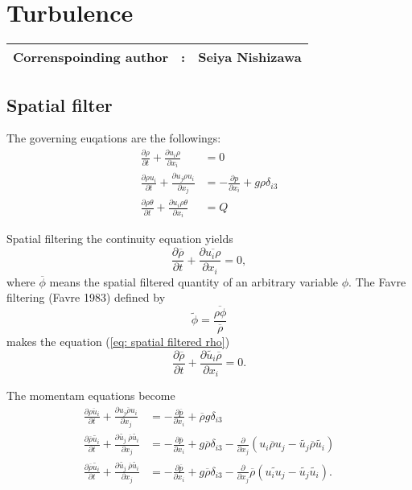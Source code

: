 %

\section{Turbulence}
{\bf \Large 
\begin{tabular}{ccc}
\hline
  Correnspoinding author & : & Seiya Nishizawa\\
\hline
\end{tabular}
}
\subsection{Spatial filter}

The governing euqations are the followings:
\begin{align}
  \frac{\partial\rho}{\partial t} + \frac{\partial u_i \rho}{\partial x_i} 
  &= 0 \\
  \frac{\partial\rho u_i}{\partial t}
  + \frac{\partial u_j \rho u_i}{\partial x_j}
  &= -\frac{\partial p}{\partial x_i} + g \rho \delta_{i3} \\
  \frac{\partial\rho \theta}{\partial t}
  + \frac{\partial u_i \rho \theta}{\partial x_i}
  &= Q
\end{align}

Spatial filtering the continuity equation yields
\begin{equation}
  \frac{\partial \overline{\rho}}{\partial t} + \frac{\partial \overline{u_i \rho}}{\partial x_i} = 0, \label{eq: spatial filtered rho}
\end{equation}
where $\overline{\phi}$ means the spatial filtered quantity of an arbitrary variable $\phi$.
The Favre filtering (Favre 1983) defined by
\begin{equation}
  \widetilde{\phi} = \frac{\overline{\rho \phi}}{\overline{\rho}}
\end{equation}
makes the equation (\ref{eq: spatial filtered rho})
\begin{equation}
  \frac{\partial \overline{\rho}}{\partial t} + \frac{\partial \widetilde{u_i}\overline{\rho}}{\partial x_i} = 0.
\end{equation}


The momentam equations become
\begin{align}
  \frac{\partial \overline{\rho u_i}}{\partial t} + \frac{\partial \overline{u_j\rho u_i}}{\partial x_j} &= -\frac{\partial \overline{p}}{\partial x_i} + \overline{\rho} g\delta_{i3} \\
  \frac{\partial \overline{\rho}\widetilde{u_i}}{\partial t} + \frac{\partial \widetilde{u_j}\:\overline{\rho}\widetilde{u_i}}{\partial x_j} &= -\frac{\partial \overline{p}}{\partial x_i} + g\overline{\rho} \delta_{i3}
    -\frac{\partial}{\partial x_j}\left(\overline{u_i \rho u_j} - \widetilde{u_j}\overline{\rho}\widetilde{u_i}\right) \\
  \frac{\partial \overline{\rho}\widetilde{u_i}}{\partial t} + \frac{\partial \widetilde{u_j}\:\overline{\rho}\widetilde{u_i}}{\partial x_j} &= -\frac{\partial \overline{p}}{\partial x_i} + g\overline{\rho} \delta_{i3}
    -\frac{\partial}{\partial x_j}\overline{\rho}\left(\widetilde{u_i u_j} - \widetilde{u_j}\widetilde{u_i}\right).
\end{align}


